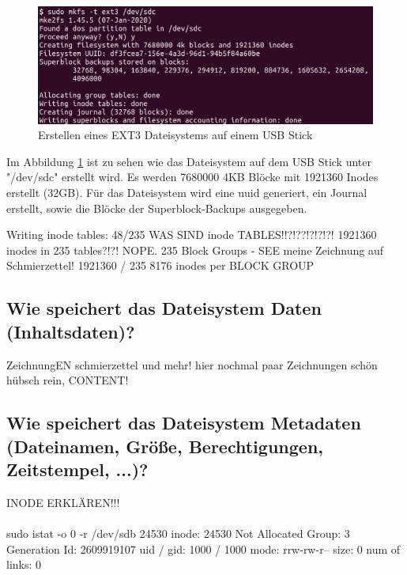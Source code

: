 \begin{figure}[H]
	\centering
	\includegraphics[width=12cm,keepaspectratio=true]{pictures/createfs.png}
	\caption{
		Erstellen eines EXT3 Dateisystems auf einem USB Stick
	}
	\label{fig:createfs}
\end{figure}

Im Abbildung \ref{fig:createfs} ist zu sehen wie das Dateisystem auf dem USB Stick unter "/dev/sdc" erstellt wird. Es werden 7680000 4KB Blöcke mit 1921360 Inodes erstellt (32GB). Für das Dateisystem wird eine \ac{uuid} generiert, ein Journal erstellt, sowie die Blöcke der Superblock-Backups ausgegeben.


Writing inode tables:  48/235
WAS SIND inode TABLES!!?!??!?!?!?! 1921360 inodes in 235 tables?!?! NOPE. 235 Block Groups - SEE meine Zeichnung auf Schmierzettel!
1921360 / 235
8176 inodes per BLOCK GROUP
\\

\subsection{Wie speichert das Dateisystem Daten (Inhaltsdaten)?}


ZeichnungEN schmierzettel und mehr! hier nochmal paar Zeichnungen schön hübsch rein, CONTENT!



\subsection{Wie speichert das Dateisystem Metadaten (Dateinamen, Größe, Berechtigungen, Zeitstempel, ...)?}

INODE ERKLÄREN!!!\\
\\

sudo istat -o 0 -r /dev/sdb 24530
inode: 24530
Not Allocated
Group: 3
Generation Id: 2609919107
uid / gid: 1000 / 1000
mode: rrw-rw-r--
size: 0
num of links: 0


